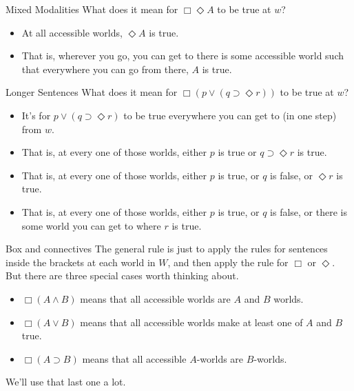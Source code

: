 \documentclass[
  14pt,
  letterpaper,
  ignorenonframetext,
  aspectratio=169,
]{beamer}
\providecommand{\tightlist}{%
  \setlength{\itemsep}{0pt}\setlength{\parskip}{0pt}}\usepackage{longtable,booktabs,array}
\begin{document}
\begin{frame}{Mixed Modalities}
\protect\hypertarget{mixed-modalities-1}{}
What does it mean for \(\Box \Diamond A\) to be true at \(w\)?

\begin{itemize}[<+->]
\tightlist
\item
  At all accessible worlds, \(\Diamond A\) is true.
\item
  That is, wherever you go, you can get to there is some accessible
  world such that everywhere you can go from there, \(A\) is true.
\end{itemize}
\end{frame}

\begin{frame}{Longer Sentences}
\protect\hypertarget{longer-sentences}{}
What does it mean for \(\Box(p \vee (q \supset \Diamond r))\) to be true
at \(w\)?

\begin{itemize}[<+->]
\tightlist
\item
  It's for \(p \vee (q \supset \Diamond r)\) to be true everywhere you
  can get to (in one step) from \(w\).
\item
  That is, at every one of those worlds, either \(p\) is true or
  \(q \supset \Diamond r\) is true.
\item
  That is, at every one of those worlds, either \(p\) is true, or \(q\)
  is false, or \(\Diamond r\) is true.
\item
  That is, at every one of those worlds, either \(p\) is true, or \(q\)
  is false, or there is some world you can get to where \(r\) is true.
\end{itemize}
\end{frame}

\begin{frame}{Box and connectives}
\protect\hypertarget{box-and-connectives}{}
The general rule is just to apply the rules for sentences inside the
brackets at each world in \(W\), and then apply the rule for \(\Box\) or
\(\Diamond\). But there are three special cases worth thinking about.

\begin{itemize}[<+->]
\tightlist
\item
  \(\Box(A \wedge B)\) means that all accessible worlds are \(A\) and
  \(B\) worlds.
\item
  \(\Box(A \vee B)\) means that all accessible worlds make at least one
  of \(A\) and \(B\) true.
\item
  \(\Box(A \supset B)\) means that all accessible \(A\)-worlds are
  \(B\)-worlds.
\end{itemize}

We'll use that last one a lot.
\end{frame}
\end{document}
